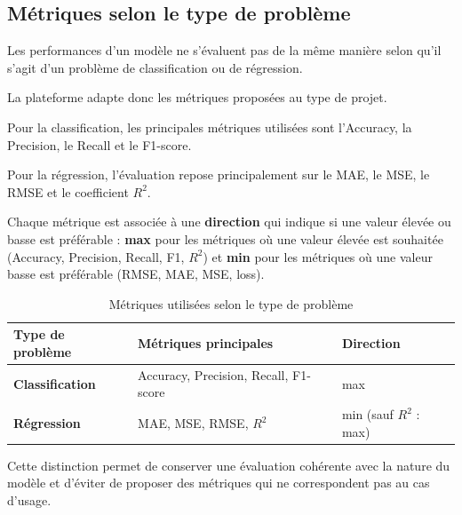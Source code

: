 \subsection{Métriques selon le type de problème}
\label{subsec:sprint2-metrics}

Les performances d'un modèle ne s'évaluent pas de la même manière
selon qu'il s'agit d'un problème de classification ou de régression.

La plateforme adapte donc les métriques proposées au type de projet.

Pour la classification, les principales métriques utilisées sont
l'Accuracy, la Precision, le Recall et le F1-score.

Pour la régression, l'évaluation repose principalement sur le MAE,
le MSE, le RMSE et le coefficient $R^2$.

Chaque métrique est associée à une \textbf{direction} qui indique
si une valeur élevée ou basse est préférable : \textbf{max} pour
les métriques où une valeur élevée est souhaitée (Accuracy, Precision,
Recall, F1, $R^2$) et \textbf{min} pour les métriques où une valeur
basse est préférable (RMSE, MAE, MSE, loss).

\begin{table}[H]

\centering
\small

\renewcommand{\arraystretch}{1.15}

\begin{tabular}{|p{4cm}|p{6.5cm}|p{2cm}|}

\hline

\rowcolor{cyan!20}
\textbf{Type de problème}
&
\textbf{Métriques principales}
&
\textbf{Direction}
\\
\hline

\textbf{Classification}
&
Accuracy, Precision, Recall, F1-score
&
max
\\
\hline

\rowcolor{cyan!7}
\textbf{Régression}
&
MAE, MSE, RMSE, $R^2$
&
min (sauf $R^2$ : max)
\\
\hline

\end{tabular}

\caption{Métriques utilisées selon le type de problème}
\label{tab:sprint2-metrics}

\end{table}

Cette distinction permet de conserver une évaluation cohérente avec la
nature du modèle et d'éviter de proposer des métriques qui ne
correspondent pas au cas d'usage.


